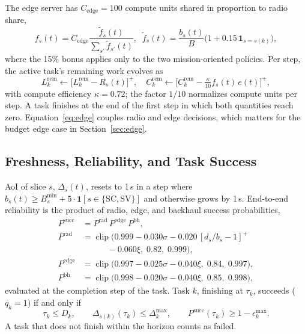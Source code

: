 \documentclass[conference]{IEEEtran}
\DeclareMathOperator{\clip}{clip}
\begin{document}
The edge server has $C_{\mathrm{edge}}=100$ compute units shared in proportion to radio share,
\begin{equation}
f_s(t)=C_{\mathrm{edge}}\frac{\tilde f_s(t)}{\sum_{s'}\tilde f_{s'}(t)},\;\; \tilde f_s(t)=\frac{b_s(t)}{B}\big(1+0.15\,\mathbf{1}_{s=s(k)}\big),
\label{eq:edge}
\end{equation}
where the 15\% bonus applies only to the two mission-oriented policies. Per step, the active task's remaining work evolves as
\begin{equation}
L_k^{\mathrm{rem}}\leftarrow\big[L_k^{\mathrm{rem}}-R_s(t)\big]^+,\quad C_k^{\mathrm{rem}}\leftarrow\big[C_k^{\mathrm{rem}}-\tfrac{\kappa}{10}f_s(t)\,e(t)\big]^+,
\label{eq:progress}
\end{equation}
with compute efficiency $\kappa=0.72$; the factor $1/10$ normalizes compute units per step. A task finishes at the end of the first step in which both quantities reach zero. Equation~\eqref{eq:edge} couples radio and edge decisions, which matters for the budget edge case in Section~\ref{sec:edge}.

\subsection{Freshness, Reliability, and Task Success}
AoI of slice $s$, $\Delta_s(t)$, resets to 1\,s in a step where $b_s(t)\ge B_s^{\min}+5\cdot\mathbf{1}[s\in\{\mathrm{SC},\mathrm{SV}\}]$ and otherwise grows by 1\,s. End-to-end reliability is the product of radio, edge, and backhaul success probabilities,
\begin{equation}
\begin{aligned}
P^{\mathrm{succ}} &= P^{\mathrm{rad}}\,P^{\mathrm{edge}}\,P^{\mathrm{bh}},\\
P^{\mathrm{rad}} &= \clip\big(0.999-0.030\sigma-0.020\,[d_s/b_s-1]^+\\
&\qquad\quad -0.060\xi,\;0.82,\;0.999\big),\\
P^{\mathrm{edge}} &= \clip\big(0.997-0.025\sigma-0.040\xi,\;0.84,\;0.997\big),\\
P^{\mathrm{bh}} &= \clip\big(0.998-0.020\sigma-0.040\xi,\;0.85,\;0.998\big),
\end{aligned}
\label{eq:rel}
\end{equation}
evaluated at the completion step of the task. Task $k$, finishing at $\tau_k$, succeeds ($q_k=1$) if and only if
\begin{equation}
\tau_k\le D_k,\qquad \Delta_{s(k)}(\tau_k)\le\Delta_k^{\max},\qquad P^{\mathrm{succ}}(\tau_k)\ge 1-\epsilon_k^{\max}.
\label{eq:success}
\end{equation}
A task that does not finish within the horizon counts as failed.
\end{document}
